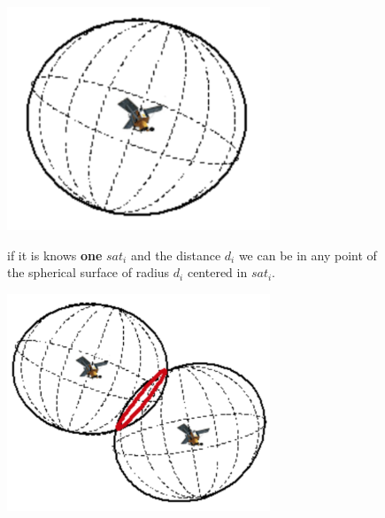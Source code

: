 \begin{figure}[h]
    \centering
    \begin{minipage}[t]{0.3\textwidth}
        \centering
        \includegraphics[width=0.7\textwidth]{img/gps_one}

        \begin{flushleft}
            if it is knows \textbf{one} $sat_i$ and the distance $d_i$ we can be in any point of the spherical surface of radius $d_i$ centered in $sat_i$.
        \end{flushleft}
    \end{minipage}
    \begin{minipage}[t]{0.3\textwidth}
        \centering
        \includegraphics[width=0.7\textwidth]{img/gps_two}


\end{minipage}
\end{figure}
